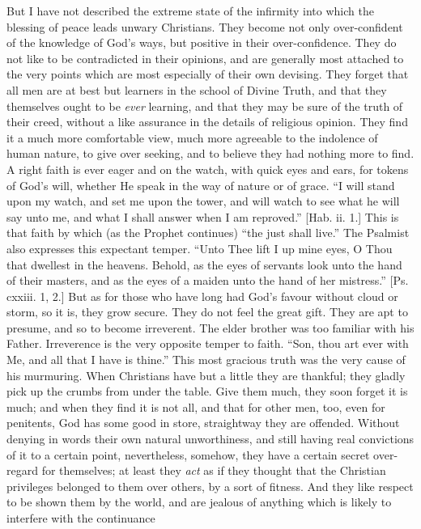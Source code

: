 But I have not described the extreme state of the infirmity into
which the blessing of peace leads unwary Christians. They become not
only over-confident of the knowledge of God's ways, but positive in
their over-confidence. They do not like to be contradicted in their
opinions, and are generally most attached to the very points which are
most especially of their own devising. They forget that all men are at
best but learners in the school of Divine Truth, and that they
themselves ought to be \emph{ever} learning, and that they may be sure
of the truth of their creed, without a like assurance in the details
of religious opinion. They find it a much more comfortable view, much
more agreeable to the indolence of human nature, to give over seeking,
and to believe they had nothing more to find. A right faith is ever
eager and on the watch, with quick eyes and ears, for tokens of God's
will, whether He speak in the way of nature or of grace. ``I will
stand upon my watch, and set me upon the tower, and will watch to see
what he will say unto me, and what I shall answer when I am
reproved.'' [Hab. ii. 1.] This is that faith by which (as the
Prophet continues) ``the just shall live.'' The Psalmist also
expresses this expectant temper. ``Unto Thee lift I up mine eyes,
O Thou that dwellest in the heavens. Behold, as the eyes of servants
look unto the hand of their masters, and as the eyes of a maiden unto
the hand of her mistress.'' [Ps. cxxiii. 1, 2.] But as for those
who have long had God's favour without cloud or storm, so it is, they
grow secure. They do not feel the great gift. They are apt to presume,
and so to become irreverent. The elder brother was too familiar with
his Father. Irreverence is the very opposite temper to faith.
``Son, thou art ever with Me, and all that I have is thine.''
This most gracious truth was the very cause of his murmuring. When
Christians have but a little they are thankful; they gladly pick up
the crumbs from under the table. Give them much, they soon forget it
is much; and when they find it is not all, and that for other men,
too, even for penitents, God has some good in store, straightway they
are offended. Without denying in words their own natural unworthiness,
and still having real convictions of it to a certain point,
nevertheless, somehow, they have a certain secret over-regard for
themselves; at least they \emph{act} as if they thought that the
Christian privileges belonged to them over others, by a sort of
fitness. And they like respect to be shown them by the world, and are
jealous of anything which is likely to interfere with the continuance
